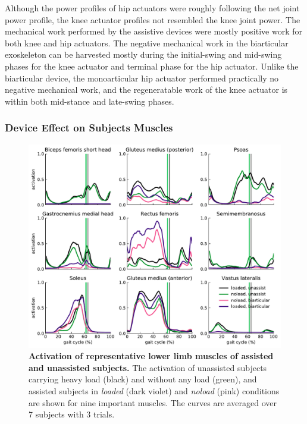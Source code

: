 \documentclass[10pt,letterpaper]{article}
\begin{document}
Although the power profiles of hip actuators were roughly following the net joint power profile, the knee actuator profiles not resembled the knee joint power. The mechanical work performed by the assistive devices were mostly positive work for both knee and hip actuators. The negative mechanical work in the biarticular exoskeleton can be harvested mostly during the initial-swing and mid-swing phases for the knee actuator and terminal phase for the hip actuator. Unlike the biarticular device, the monoarticular hip actuator performed practically no negative mechanical work, and the regeneratable work of the knee actuator is within both mid-stance and late-swing phases.
\subsubsection*{Device Effect on Subjects Muscles}
\begin{figure}[ht]   
	\centering
	\includegraphics[width=\linewidth]{Ideal_Exo_MonovsBi_Figures/PaperFigure_Biarticular_MuscleActivation.pdf}
	\vspace{1mm}
	\caption{{\small\textbf{Activation of representative lower limb muscles of assisted and unassisted subjects.} The activation of unassisted subjects carrying heavy load (black) and without any load (green), and assisted subjects in \textit{loaded} (dark violet) and \textit{noload} (pink) conditions are shown for nine important muscles. The curves are averaged over 7 subjects with 3 trials.}}
	\label{Fig_IdealExo_MusclesActivation}
\end{figure}
\end{document}
